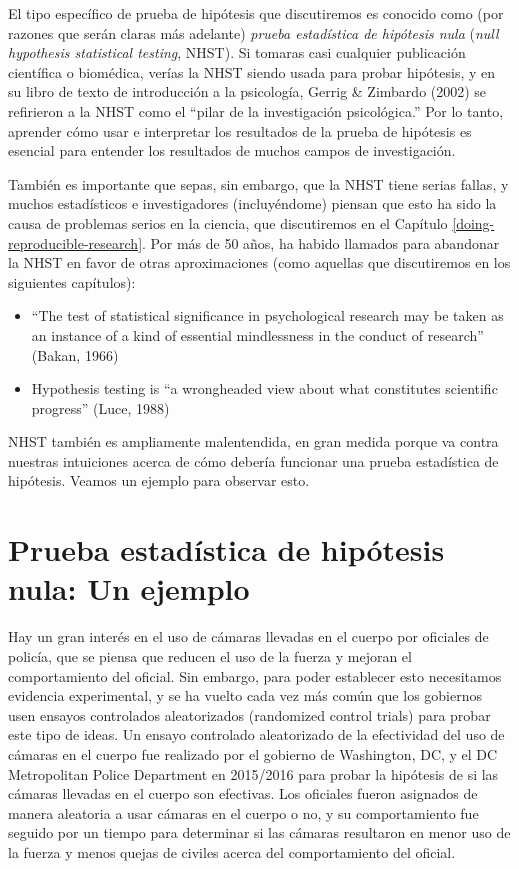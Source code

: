 \documentclass[
  12pt,
]{book}
\providecommand{\tightlist}{%
  \setlength{\itemsep}{0pt}\setlength{\parskip}{0pt}}
\begin{document}
El tipo específico de prueba de hipótesis que discutiremos es conocido como (por razones que serán claras más adelante) \emph{prueba estadística de hipótesis nula} (\emph{null hypothesis statistical testing}, NHST). Si tomaras casi cualquier publicación científica o biomédica, verías la NHST siendo usada para probar hipótesis, y en su libro de texto de introducción a la psicología, Gerrig \& Zimbardo (2002) se refirieron a la NHST como el ``pilar de la investigación psicológica.'' Por lo tanto, aprender cómo usar e interpretar los resultados de la prueba de hipótesis es esencial para entender los resultados de muchos campos de investigación.

También es importante que sepas, sin embargo, que la NHST tiene serias fallas, y muchos estadísticos e investigadores (incluyéndome) piensan que esto ha sido la causa de problemas serios en la ciencia, que discutiremos en el Capítulo \ref{doing-reproducible-research}. Por más de 50 años, ha habido llamados para abandonar la NHST en favor de otras aproximaciones (como aquellas que discutiremos en los siguientes capítulos):

\begin{itemize}
\tightlist
\item
  ``The test of statistical significance in psychological research may be taken as an instance of a kind of essential mindlessness in the conduct of research'' (Bakan, 1966)
\item
  Hypothesis testing is ``a wrongheaded view about what constitutes scientific progress'' (Luce, 1988)
\end{itemize}

NHST también es ampliamente malentendida, en gran medida porque va contra nuestras intuiciones acerca de cómo debería funcionar una prueba estadística de hipótesis. Veamos un ejemplo para observar esto.

\hypertarget{prueba-estaduxedstica-de-hipuxf3tesis-nula-un-ejemplo}{%
\section{Prueba estadística de hipótesis nula: Un ejemplo}\label{prueba-estaduxedstica-de-hipuxf3tesis-nula-un-ejemplo}}

Hay un gran interés en el uso de cámaras llevadas en el cuerpo por oficiales de policía, que se piensa que reducen el uso de la fuerza y mejoran el comportamiento del oficial. Sin embargo, para poder establecer esto necesitamos evidencia experimental, y se ha vuelto cada vez más común que los gobiernos usen ensayos controlados aleatorizados (randomized control trials) para probar este tipo de ideas. Un ensayo controlado aleatorizado de la efectividad del uso de cámaras en el cuerpo fue realizado por el gobierno de Washington, DC, y el DC Metropolitan Police Department en 2015/2016 para probar la hipótesis de si las cámaras llevadas en el cuerpo son efectivas. Los oficiales fueron asignados de manera aleatoria a usar cámaras en el cuerpo o no, y su comportamiento fue seguido por un tiempo para determinar si las cámaras resultaron en menor uso de la fuerza y menos quejas de civiles acerca del comportamiento del oficial.
\end{document}
